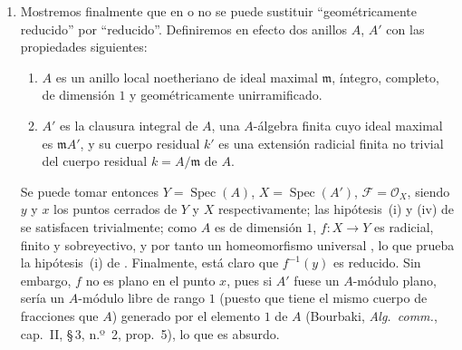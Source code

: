 \begin{remarks}[15.2.4]
\begin{enumerate}[label=(\roman*)]
Aquí $f$ es un morfismo finito, sobreyectivo y radicial, y por tanto un homeomorfismo universal , pero no es plano en el punto $x$, pues si $\mathcal O_x$ fuese un $\mathcal O_y$-módulo plano, sería un $\mathcal O_y$-módulo
libre de rango $1$ generado por el elemento $1$ de $\mathcal O_x$ (Bourbaki, \emph{Alg.\ comm.}, cap.~II, \S\,3, n.º~2, prop.~5), lo que es absurdo.
  \item Mostremos finalmente que en  o  no se puede sustituir ``geométricamente reducido'' por ``reducido''.
Definiremos en efecto dos anillos $A$, $A'$ con las propiedades siguientes:
\begin{enumerate}[label=\arabic*)]
  \item $A$ es un anillo local noetheriano de ideal maximal $\mathfrak m$, íntegro, completo, de dimensión $1$ y geométricamente unirramificado.
  \item $A'$ es la clausura integral de $A$, una $A$-álgebra finita cuyo ideal maximal es $\mathfrak mA'$, y su cuerpo residual $k'$ es una extensión radicial finita no trivial del cuerpo residual $k=A/\mathfrak m$ de $A$.
\end{enumerate}
Se puede tomar entonces $Y=\operatorname{Spec}(A)$, $X=\operatorname{Spec}(A')$, $\mathcal F=\mathcal O_X$, siendo $y$ y $x$ los puntos cerrados de $Y$ y $X$ respectivamente; las hipótesis~(i) y (iv) de  se satisfacen trivialmente; como $A$ es de dimensión $1$, $f:X\to Y$ es radicial, finito y sobreyectivo, y por tanto un homeomorfismo universal , lo que prueba la hipótesis~(i) de .
Finalmente, está claro que $f^{-1}(y)$ es reducido.
Sin embargo, $f$ no es plano en el punto $x$, pues si $A'$ fuese un $A$-módulo plano, sería un $A$-módulo libre de rango $1$ (puesto que tiene el mismo cuerpo de fracciones que $A$) generado por el elemento $1$ de $A$ (Bourbaki, \emph{Alg.\ comm.}, cap.~II, \S\,3, n.º~2, prop.~5), lo que es absurdo.


\end{enumerate}
\end{remarks}

